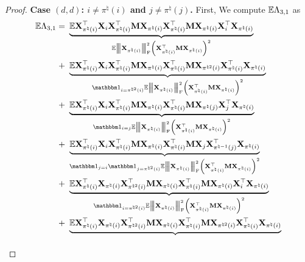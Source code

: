 \documentclass[11pt]{article}
\begin{document}
\begin{proof}
\noindent\textbf{Case $(d, d)$: $i \neq \pi^{\natural}(i)$ and $j\neq \pi^{\natural}(j)$.}
First, We compute $\mathbb{E} \Lambda_{3, 1}$ as
\begin{align}
\label{eq:xione_square_lambda31_dd_expc}
\Expc \Lambda_{3,1} =~&
\underbrace{\Expc \bX_{\pi^{\natural}(i)}^{\rmt}
\bX_{i}\bX_{\pi^{\natural}(i)}^{\rmt}
\bM
\bX_{\pi^{\natural}(i)} \bX_{\pi^{\natural}(i)}^{\rmt}
\bM
\bX_{\pi^{\natural}(i)}\bX_{i}^{\rmt}
\bX_{\pi^{\natural}(i)}}_{
\Expc \Fnorm{\bX_{\pi^{\natural}(i)}}^2 \bracket{\bX_{\pi^{\natural}(i)}^{\rmt}\bM \bX_{\pi^{\natural}(i)} }^2
}\notag  \\
+~&
\underbrace{\Expc \bX_{\pi^{\natural}(i)}^{\rmt}
\bX_{i}\bX_{\pi^{\natural}(i)}^{\rmt}
\bM
\bX_{\pi^{\natural}(i)} \bX_{\pi^{\natural}(i)}^{\rmt}
\bM
\bX_{\pi^{\natural 2}(i)}\bX_{\pi^{\natural}(i)}^{\rmt}
\bX_{\pi^{\natural}(i)}}_{
\Ind_{i = \pi^{\natural 2}(i)}
\Expc \Fnorm{\bX_{\pi^{\natural}(i)}}^2 \bracket{\bX_{\pi^{\natural}(i)}^{\rmt}\bM \bX_{\pi^{\natural}(i)} }^2
} \notag \\
+~&
\underbrace{
\Expc \bX_{\pi^{\natural}(i)}^{\rmt} %
\bX_{i}\bX_{\pi^{\natural}(i)}^{\rmt}
\bM
\bX_{\pi^{\natural}(i)} \bX_{\pi^{\natural}(i)}^{\rmt}
\bM
\bX_{\pi^{\natural}(j)}\bX_{j}^{\rmt}
\bX_{\pi^{\natural}(i)}}_{
\Ind_{i = j}
\Expc \Fnorm{\bX_{\pi^{\natural}(i)}}^2 \bracket{\bX_{\pi^{\natural}(i)}^{\rmt}\bM \bX_{\pi^{\natural}(i)} }^2
} \notag \\
+~& \underbrace{\Expc \bX_{\pi^{\natural}(i)}^{\rmt}
\bX_{i}\bX_{\pi^{\natural}(i)}^{\rmt}
\bM
\bX_{\pi^{\natural}(i)} \bX_{\pi^{\natural}(i)}^{\rmt}
\bM
\bX_{j}\bX_{\pi^{\natural -1}(j)}^{\rmt}
\bX_{\pi^{\natural}(i)}}_{
\Ind_{j = i}\Ind_{j = \pi^{\natural 2}(i)}
\Expc \Fnorm{\bX_{\pi^{\natural}(i)}}^2 \bracket{\bX_{\pi^{\natural}(i)}^{\rmt}\bM \bX_{\pi^{\natural}(i)} }^2
} \notag \\
+~&
\underbrace{
\Expc \bX_{\pi^{\natural}(i)}^{\rmt}
\bX_{\pi^{\natural}(i)}\bX_{\pi^{\natural 2}(i)}^{\rmt}
\bM
\bX_{\pi^{\natural}(i)} \bX_{\pi^{\natural}(i)}^{\rmt}
\bM
\bX_{\pi^{\natural}(i)}\bX_{i}^{\rmt}
\bX_{\pi^{\natural}(i)}}_{
\Ind_{i = \pi^{\natural 2}(i)}
\Expc \Fnorm{\bX_{\pi^{\natural}(i)}}^2 \bracket{\bX_{\pi^{\natural}(i)}^{\rmt}\bM \bX_{\pi^{\natural}(i)} }^2
} \notag  \\
+~& \underbrace{
\Expc \bX_{\pi^{\natural}(i)}^{\rmt}
\bX_{\pi^{\natural}(i)}\bX_{\pi^{\natural 2}(i)}^{\rmt}
\bM
\bX_{\pi^{\natural}(i)} \bX_{\pi^{\natural}(i)}^{\rmt}
\bM
\bX_{\pi^{\natural 2}(i)}\bX_{\pi^{\natural}(i)}^{\rmt}
\bX_{\pi^{\natural}(i)}}_{
}
\end{align}
\end{proof}
\end{document}
